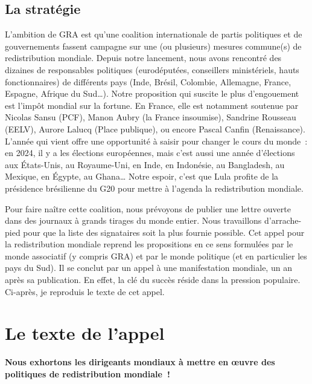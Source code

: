 \documentclass[a5paper,french]{memoir}
\begin{document}
\subsection{La stratégie}

L'ambition de GRA est qu'une coalition internationale de partis politiques et de gouvernements fassent campagne sur une (ou plusieurs) mesures commune(s) de redistribution mondiale. Depuis notre lancement, nous avons rencontré des dizaines de responsables politiques (eurodéputé\textperiodcentered{}e\textperiodcentered{}s, conseillers ministériels, hauts fonctionnaires) de différents pays (Inde, Brésil, Colombie, Allemagne, France, Espagne, Afrique du Sud\dots). Notre proposition qui suscite le plus d'engouement est l'impôt mondial sur la fortune. En France, elle est notamment soutenue par Nicolas Sansu (PCF), Manon Aubry (la France insoumise), Sandrine Rousseau (EELV), Aurore Lalucq (Place publique), ou encore Pascal Canfin (Renaissance). L'année qui vient offre une opportunité à saisir pour changer le cours du monde~: en 2024, il y a les élections européennes, mais c'est aussi une année d'élections aux États-Unis, au Royaume-Uni, en Inde, en Indonésie, au Bangladesh, au Mexique, en Égypte, au Ghana\dots{} Notre espoir, c'est que Lula profite de la présidence brésilienne du G20 pour mettre à l'agenda la redistribution mondiale. 

Pour faire naître cette coalition, nous prévoyons de publier une lettre ouverte dans des journaux à grands tirages du monde entier. Nous travaillons d'arrache-pied pour que la liste des signataires soit la plus fournie possible. Cet appel pour la redistribution mondiale reprend les propositions en ce sens formulées par le monde  associatif (y compris GRA) et par le monde politique (et en particulier les pays du Sud). Il se conclut par un appel à une manifestation mondiale, un an après sa publication. En effet, la clé du succès réside dans la pression populaire. Ci-après, je reproduis le texte de cet appel.%

\section{Le texte de l'appel}

\begin{center}
\textbf{Nous exhortons les dirigeants mondiaux à mettre en œuvre des politiques de redistribution mondiale~!}
\end{center}
\end{document}
